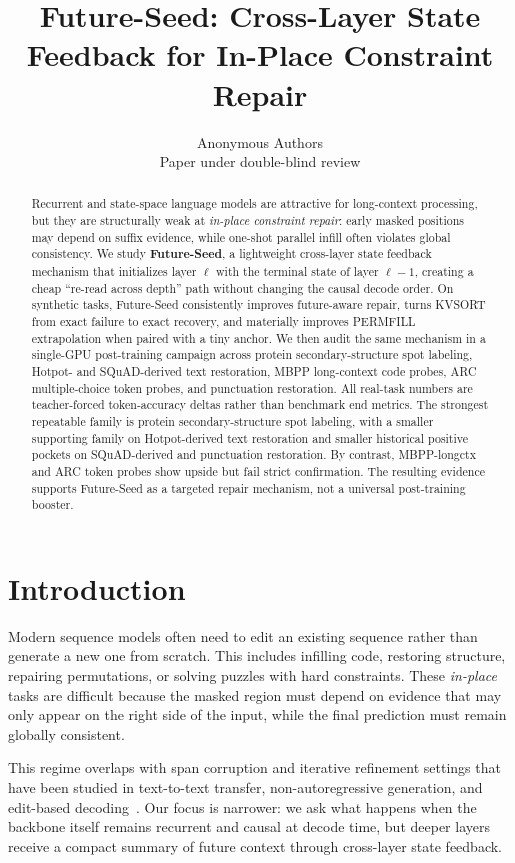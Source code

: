 \documentclass{article}
\title{Future-Seed: Cross-Layer State Feedback for In-Place Constraint Repair}
\author{
  Anonymous Authors \\
  Paper under double-blind review
}
\begin{document}
\maketitle

\begin{abstract}
Recurrent and state-space language models are attractive for long-context processing, but they are structurally weak at \emph{in-place constraint repair}: early masked positions may depend on suffix evidence, while one-shot parallel infill often violates global consistency. We study \textbf{Future-Seed}, a lightweight cross-layer state feedback mechanism that initializes layer $\ell$ with the terminal state of layer $\ell-1$, creating a cheap ``re-read across depth'' path without changing the causal decode order. On synthetic tasks, Future-Seed consistently improves future-aware repair, turns KVSORT from exact failure to exact recovery, and materially improves PERMFILL extrapolation when paired with a tiny anchor. We then audit the same mechanism in a single-GPU post-training campaign across protein secondary-structure spot labeling, Hotpot- and SQuAD-derived text restoration, MBPP long-context code probes, ARC multiple-choice token probes, and punctuation restoration. All real-task numbers are teacher-forced token-accuracy deltas rather than benchmark end metrics. The strongest repeatable family is protein secondary-structure spot labeling, with a smaller supporting family on Hotpot-derived text restoration and smaller historical positive pockets on SQuAD-derived and punctuation restoration. By contrast, MBPP-longctx and ARC token probes show upside but fail strict confirmation. The resulting evidence supports Future-Seed as a targeted repair mechanism, not a universal post-training booster.
\end{abstract}

\section{Introduction}
Modern sequence models often need to edit an existing sequence rather than generate a new one from scratch. This includes infilling code, restoring structure, repairing permutations, or solving puzzles with hard constraints. These \emph{in-place} tasks are difficult because the masked region must depend on evidence that may only appear on the right side of the input, while the final prediction must remain globally consistent.

This regime overlaps with span corruption and iterative refinement settings that have been studied in text-to-text transfer, non-autoregressive generation, and edit-based decoding~\citep{raffel2020t5,lee2018iterative,ghazvininejad2019maskpredict,gu2019levenshtein}. Our focus is narrower: we ask what happens when the backbone itself remains recurrent and causal at decode time, but deeper layers receive a compact summary of future context through cross-layer state feedback.
\end{document}
